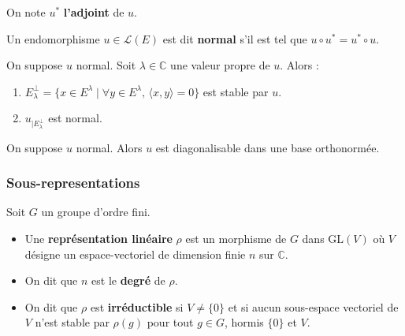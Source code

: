 
	\begin{notation}
		On note $u^*$ \textbf{l'adjoint} de $u$.
	\end{notation}

	\begin{definition}
		Un endomorphisme $u \in \mathcal{L}(E)$ est dit \textbf{normal} s'il est tel que $u \circ u^* = u^* \circ u$.
	\end{definition}

	\begin{proposition}
		On suppose $u$ normal. Soit $\lambda \in \mathbb{C}$ une valeur propre de $u$. Alors :
		\begin{enumerate}[label=(\roman*)]
			\item $E_\lambda^\perp = \{ x \in E^\lambda \mid \forall y \in E^\lambda, \, \langle x, y \rangle = 0 \}$ est stable par $u$.
			\item $u_{| E_\lambda^\perp}$ est normal.
		\end{enumerate}
	\end{proposition}

	\begin{corollary}
		On suppose $u$ normal. Alors $u$ est diagonalisable dans une base orthonormée.
	\end{corollary}

	\subsubsection{Sous-representations}


	Soit $G$ un groupe d'ordre fini.

	\begin{definition}
		\begin{itemize}
			\item Une \textbf{représentation linéaire} $\rho$ est un morphisme de $G$ dans $\mathrm{GL}(V)$ où $V$ désigne un espace-vectoriel de dimension finie $n$ sur $\mathbb{C}$.
			\item On dit que $n$ est le \textbf{degré} de $\rho$.
			\item On dit que $\rho$ est \textbf{irréductible} si $V \neq \{ 0 \}$ et si aucun sous-espace vectoriel de $V$ n'est stable par $\rho(g)$ pour tout $g \in G$, hormis $\{ 0 \}$ et $V$.
		\end{itemize}
	\end{definition}

